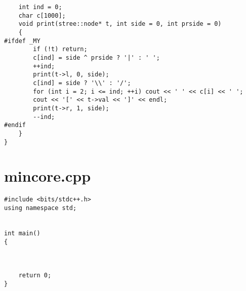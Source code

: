 \documentclass[a4paper,12pt]{report}
\begin{document}
\begin{lstlisting}
    int ind = 0;
    char c[1000];
    void print(stree::node* t, int side = 0, int prside = 0)
    {
#ifdef _MY
        if (!t) return;
        c[ind] = side ^ prside ? '|' : ' ';
        ++ind;
        print(t->l, 0, side);
        c[ind] = side ? '\\' : '/';
        for (int i = 2; i <= ind; ++i) cout << ' ' << c[i] << ' ';
        cout << '[' << t->val << ']' << endl;
        print(t->r, 1, side);
        --ind;
#endif
    }
}
\end{lstlisting}


\section{mincore.cpp}
\begin{lstlisting}
#include <bits/stdc++.h>
using namespace std;


int main()
{



	return 0;
}
\end{lstlisting}
\end{document}
